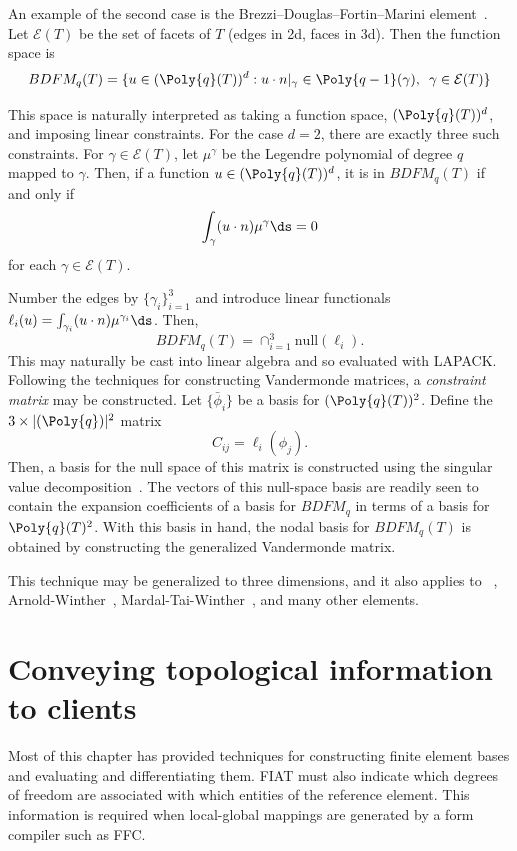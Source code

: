 An example of the second case is the Brezzi--Douglas--Fortin--Marini
element~\citep{BrezziFortin1991}.  Let \( \mathcal{E}(T) \) be the set of
facets of \( T \) (edges in 2d, faces in 3d). Then the function
space is
\[
BDFM_q(T) = \{ u \in (\Poly{q}(T))^d : u\cdot n|_{\gamma} \in
\Poly{q-1}(\gamma), \, \, \, \gamma \in \mathcal{E}(T) \}
\]

This space is naturally interpreted as taking a function space, \(
(\Poly{q}(T))^d \), and imposing linear constraints.  For the case \( d =
2 \), there are exactly three such constraints.  For \( \gamma \in
\mathcal{E}(T) \), let \( \mu^\gamma \) be the Legendre polynomial of
degree \( q \) mapped to \( \gamma \).  Then, if a function \( u \in
(\Poly{q}(T))^d \), it is in \( BDFM_q(T) \) if and only if
\[
\int_{\gamma} ( u \cdot n ) \mu^\gamma \ds = 0
\]
for each \( \gamma \in \mathcal{E}(T) \).

Number the edges by \( \{ \gamma_i \}_{i=1}^3 \) and introduce linear
functionals \( \ell_i(u) = \int_{\gamma_i} (u \cdot n) \mu^{\gamma_i}
\ds \).  Then,
\[
BDFM_q(T) = \cap_{i=1}^3 \mathrm{null}(\ell_i).
\]
This may naturally be cast into linear algebra and so evaluated with
LAPACK.  Following the techniques for constructing Vandermonde matrices,
a \emph{constraint matrix} may be constructed.  Let \( \{ \bar{\phi}_i \}
\) be a basis for \( (\Poly{q}(T))^2 \).  Define the \( 3 \times |(\Poly{q})|^2
\) matrix
\[
C_{ij} = \ell_i( \phi_j ).
\]
Then, a basis for the null space of this matrix is constructed using
the singular value decomposition~\citep{GolubVan1996}.  The vectors of this
null-space basis are readily seen to contain the expansion coefficients
of a basis for \( BDFM_q \) in terms of a basis for \( \Poly{q}(T)^2 \).
With this basis in hand, the nodal basis for \( BDFM_q(T) \) is obtained
by constructing the generalized Vandermonde matrix.

This technique may be generalized to three dimensions,
and it also applies to \nedelec{}~\citep{Nedelec1980},
Arnold-Winther~\citep{ArnoldWinther2002},
Mardal-Tai-Winther~\citep{MardalTaiWinther2002}, and many other elements.

\section{Conveying topological information to clients}

Most of this chapter has provided techniques for constructing finite
element bases and evaluating and differentiating them.  FIAT must also
indicate which degrees of freedom are associated with which entities of
the reference element.  This information is required when local-global
mappings are generated by a form compiler such as FFC.

